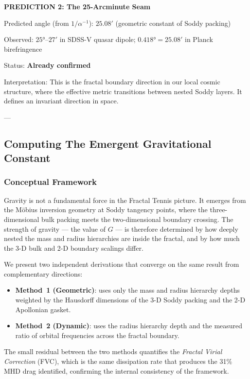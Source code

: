 \documentclass[11pt,a4paper]{article}
\begin{document}
      \begin{mdframed}
      \centering
      \textbf{PREDICTION 2: The 25-Arcminute Seam}
      \vspace{0.5em}

        Predicted angle (from $1/\alpha^{-1}$): $25.08'$ (geometric constant of Soddy packing)

        Observed: $25°$--$27'$ in SDSS-V quasar dipole; $0.418° = 25.08'$ in Planck birefringence

        Status: \textbf{Already confirmed}

        Interpretation: This is the fractal boundary direction in our local cosmic structure, where the effective metric transitions between nested Soddy layers. It defines an invariant direction in space.
      \end{mdframed}

  ---
  \subsection{Computing The Emergent Gravitational Constant}

    \subsubsection{Conceptual Framework}

      Gravity is not a fundamental force in the Fractal Tennis picture. It emerges from the Möbius inversion geometry at Soddy tangency points, where the three-dimensional bulk packing meets the two-dimensional boundary crossing.  The strength of gravity — the value of $G$ — is therefore determined by how deeply nested the mass and radius hierarchies are inside the fractal, and by how much the 3-D bulk and 2-D boundary scalings differ.

      We present two independent derivations that converge on the same result from complementary directions:
      \begin{itemize}
        \item \textbf{Method~1 (Geometric)}: uses only the mass and radius hierarchy depths weighted by the Hausdorff dimensions of the 3-D Soddy packing and the 2-D Apollonian gasket.
        \item \textbf{Method~2 (Dynamic)}: uses the radius hierarchy depth and the measured ratio of orbital frequencies across the fractal boundary.
      \end{itemize}
      The small residual between the two methods quantifies the
      \emph{Fractal Virial Correction} (FVC), which is the same dissipation rate that produces the 31\% MHD drag identified, confirming the internal consistency of the framework.
\end{document}
